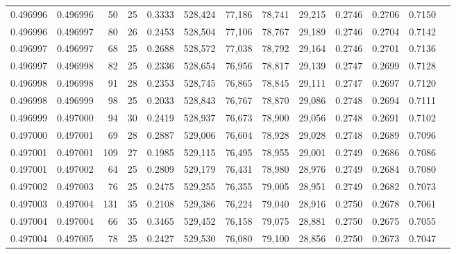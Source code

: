 \begin{tabular}{rrrrrrrrrrrrr}
0.496996 & 0.496996 &  50 &  25 &                                     0.3333 & 528,424 &  77,186 &  78,741 &  29,215 & 0.2746 & 0.2706 & 0.7150 \\
0.496996 & 0.496997 &  80 &  26 &                                     0.2453 & 528,504 &  77,106 &  78,767 &  29,189 & 0.2746 & 0.2704 & 0.7142 \\
0.496997 & 0.496997 &  68 &  25 &                                     0.2688 & 528,572 &  77,038 &  78,792 &  29,164 & 0.2746 & 0.2701 & 0.7136 \\
0.496997 & 0.496998 &  82 &  25 &                                     0.2336 & 528,654 &  76,956 &  78,817 &  29,139 & 0.2747 & 0.2699 & 0.7128 \\
0.496998 & 0.496998 &  91 &  28 &                                     0.2353 & 528,745 &  76,865 &  78,845 &  29,111 & 0.2747 & 0.2697 & 0.7120 \\
0.496998 & 0.496999 &  98 &  25 &                                     0.2033 & 528,843 &  76,767 &  78,870 &  29,086 & 0.2748 & 0.2694 & 0.7111 \\
0.496999 & 0.497000 &  94 &  30 &                                     0.2419 & 528,937 &  76,673 &  78,900 &  29,056 & 0.2748 & 0.2691 & 0.7102 \\
0.497000 & 0.497001 &  69 &  28 &                                     0.2887 & 529,006 &  76,604 &  78,928 &  29,028 & 0.2748 & 0.2689 & 0.7096 \\
0.497001 & 0.497001 & 109 &  27 &                                     0.1985 & 529,115 &  76,495 &  78,955 &  29,001 & 0.2749 & 0.2686 & 0.7086 \\
0.497001 & 0.497002 &  64 &  25 &                                     0.2809 & 529,179 &  76,431 &  78,980 &  28,976 & 0.2749 & 0.2684 & 0.7080 \\
0.497002 & 0.497003 &  76 &  25 &                                     0.2475 & 529,255 &  76,355 &  79,005 &  28,951 & 0.2749 & 0.2682 & 0.7073 \\
0.497003 & 0.497004 & 131 &  35 &                                     0.2108 & 529,386 &  76,224 &  79,040 &  28,916 & 0.2750 & 0.2678 & 0.7061 \\
0.497004 & 0.497004 &  66 &  35 &                                     0.3465 & 529,452 &  76,158 &  79,075 &  28,881 & 0.2750 & 0.2675 & 0.7055 \\
0.497004 & 0.497005 &  78 &  25 &                                     0.2427 & 529,530 &  76,080 &  79,100 &  28,856 & 0.2750 & 0.2673 & 0.7047 \\

\end{tabular}
